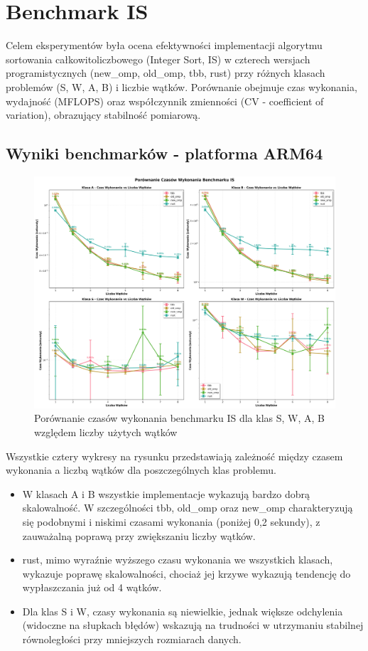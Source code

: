 
\section{Benchmark IS}
Celem eksperymentów była ocena efektywności implementacji algorytmu sortowania całkowitoliczbowego (Integer Sort, IS) w czterech wersjach programistycznych (new\_omp, old\_omp, tbb, rust) przy różnych klasach problemów (S, W, A, B) i liczbie wątków. Porównanie obejmuje czas wykonania, wydajność (MFLOPS) oraz współczynnik zmienności (CV - coefficient of variation), obrazujący stabilność pomiarową.

\subsection{Wyniki benchmarków - platforma ARM64}
\begin{figure}[H]
    \centering
    \includegraphics[width=\textwidth]{analiza/images/parallel/is/is_porownanie_czasow_wykonania.png}
    \caption{Porównanie czasów wykonania benchmarku IS dla klas S, W, A, B względem liczby użytych wątków}
    \label{is_porownanie_czasow_wykonania}
\end{figure}

Wszystkie cztery wykresy na rysunku przedstawiają zależność między czasem wykonania a liczbą wątków dla poszczególnych klas problemu.
\begin{itemize}
    \item W klasach A i B wszystkie implementacje wykazują bardzo dobrą skalowalność. W szczególności tbb, old\_omp oraz new\_omp charakteryzują się podobnymi i niskimi czasami wykonania (poniżej 0,2 sekundy), z zauważalną poprawą przy zwiększaniu liczby wątków.
    \item rust, mimo wyraźnie wyższego czasu wykonania we wszystkich klasach, wykazuje poprawę skalowalności, chociaż jej krzywe wykazują tendencję do wypłaszczania już od 4 wątków.
    \item Dla klas S i W, czasy wykonania są niewielkie, jednak większe odchylenia (widoczne na słupkach błędów) wskazują na trudności w utrzymaniu stabilnej równoległości przy mniejszych rozmiarach danych.
\end{itemize}



